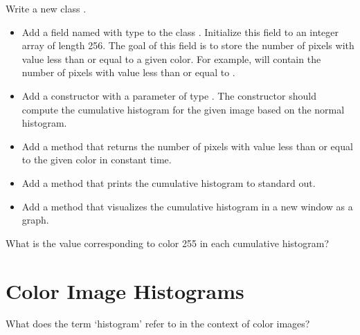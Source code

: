 \documentclass{book}
\begin{document}
\begin{exercise}
Write a new class .
\begin{itemize}
  \item  Add a field named  with type  to the class . Initialize this field to an integer array of length 256. The goal of this field is to store the number of pixels with value less than or equal to a given color. For example,  will contain the number of pixels with value less than or equal to .
  \item Add a constructor with a parameter of type . The constructor should compute the cumulative histogram for the given image based on the normal histogram.
   \item Add a method  that returns the number of pixels with value less than or equal to the given color in constant time.
  \item Add a method  that prints the cumulative histogram to standard out. 
 \item Add a method  that visualizes the cumulative histogram in a new window as a graph.
\end{itemize}
\end{exercise}

\begin{exercise}
What is the value corresponding to color 255 in each cumulative histogram?  
\end{exercise}

\section{Color Image Histograms}
What does the term `histogram' refer to in the context of color images?
\end{document}

